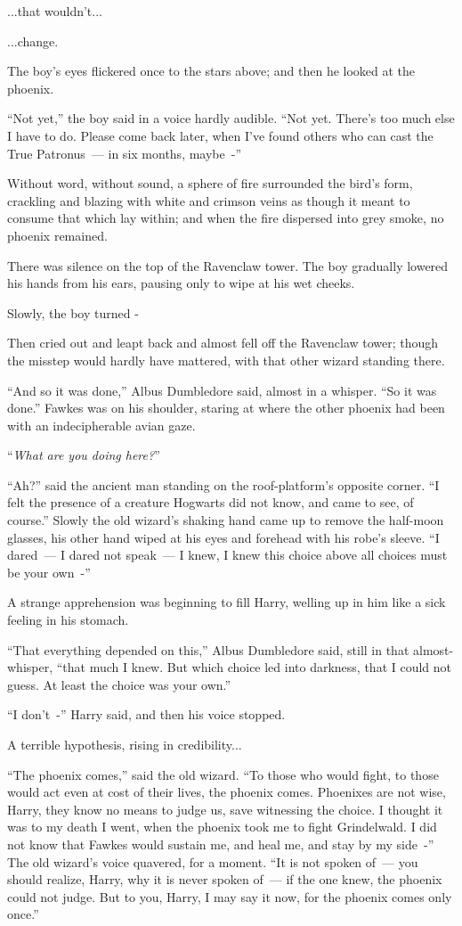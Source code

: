...that wouldn't...

...change.

The boy's eyes flickered once to the stars above; and then he looked at the phoenix.

``Not yet,'' the boy said in a voice hardly audible. ``Not yet. There's too much else I have to do. Please come back later, when I've found others who can cast the True Patronus~--- in six months, maybe~-''

Without word, without sound, a sphere of fire surrounded the bird's form, crackling and blazing with white and crimson veins as though it meant to consume that which lay within; and when the fire dispersed into grey smoke, no phoenix remained.

There was silence on the top of the Ravenclaw tower. The boy gradually lowered his hands from his ears, pausing only to wipe at his wet cheeks.

Slowly, the boy turned -

Then cried out and leapt back and almost fell off the Ravenclaw tower; though the misstep would hardly have mattered, with that other wizard standing there.

``And so it was done,'' Albus Dumbledore said, almost in a whisper. ``So it was done.'' Fawkes was on his shoulder, staring at where the other phoenix had been with an indecipherable avian gaze.

``\emph{What are you doing here?}''

``Ah?'' said the ancient man standing on the roof-platform's opposite corner. ``I felt the presence of a creature Hogwarts did not know, and came to see, of course.'' Slowly the old wizard's shaking hand came up to remove the half-moon glasses, his other hand wiped at his eyes and forehead with his robe's sleeve. ``I dared~--- I dared not speak~--- I knew, I knew this choice above all choices must be your own~-''

A strange apprehension was beginning to fill Harry, welling up in him like a sick feeling in his stomach.

``That everything depended on this,'' Albus Dumbledore said, still in that almost-whisper, ``that much I knew. But which choice led into darkness, that I could not guess. At least the choice was your own.''

``I don't~-'' Harry said, and then his voice stopped.

A terrible hypothesis, rising in credibility...

``The phoenix comes,'' said the old wizard. ``To those who would fight, to those would act even at cost of their lives, the phoenix comes. Phoenixes are not wise, Harry, they know no means to judge us, save witnessing the choice. I thought it was to my death I went, when the phoenix took me to fight Grindelwald. I did not know that Fawkes would sustain me, and heal me, and stay by my side~-'' The old wizard's voice quavered, for a moment. ``It is not spoken of~--- you should realize, Harry, why it is never spoken of~--- if the one knew, the phoenix could not judge. But to you, Harry, I may say it now, for the phoenix comes only once.''

